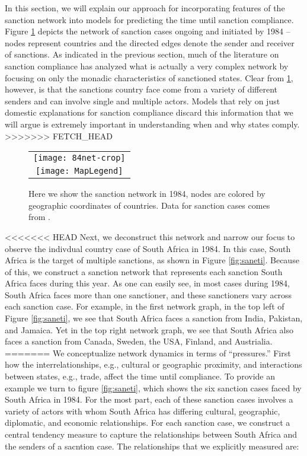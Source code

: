 In this section, we will explain our approach for incorporating features of the sanction network into models for predicting the time until sanction compliance. Figure \ref{fig:spaghetti} depicts the network of sanction cases ongoing and initiated by 1984 -- nodes represent countries and the directed edges denote the sender and receiver of sanctions. As indicated in the previous section, much of the literature on sanction compliance has analyzed what is actually a very complex network by focusing on only the monadic characteristics of sanctioned states. Clear from \ref{fig:spaghetti}, however, is that the sanctions country face come from a variety of different senders and can involve single and multiple actors. Models that rely on just domestic explanations for sanction compliance discard this information that we will argue is extremely important in understanding when and why states comply.
>>>>>>> FETCH_HEAD

\begin{figure}[ht]
  \centering
  \begin{tabular}{c}
	  \texttt{[image: 84net-crop]} \\
	  \texttt{[image: MapLegend]}
  \end{tabular}
  \caption{Here we show the sanction network in 1984, nodes are colored by geographic coordinates of countries. Data for sanction cases comes from \citet{morgan2009threat}.}
  \label{fig:spaghetti}
\end{figure}
\FloatBarrier

<<<<<<< HEAD
Next, we deconstruct this network and narrow our focus to observe the indivdual country case of South Africa in 1984. In this case, South Africa is the target of multiple sanctions, as shown in Figure \ref{fig:saneti}. Because of this, we construct a sanction network that represents each sanction South Africa faces during this year. As one can easily see, in most cases during 1984, South Africa faces more than one sanctioner, and these sanctioners vary across each sanction case. For example, in the first network graph, in the top left of Figure \ref{fig:saneti}, we see that South Africa faces a sanction from India, Pakistan, and Jamaica. Yet in the top right network graph, we see that South Africa also faces a sanction from Canada, Sweden, the USA, Finland, and Austrialia. 
=======
We conceptualize network dynamics in terms of ``pressures.'' First how the interrelationships, e.g., cultural or geographic proximity, and interactions between states, e.g., trade, affect the time until compliance. To provide an example we turn to figure \ref{fig:saneti}, which shows the six sanction cases faced by South Africa in 1984. For the most part, each of these sanction cases involves a variety of actors with whom South Africa has differing cultural, geographic, diplomatic, and economic relationships. For each sanction case, we construct a central tendency measure to capture the relationships between South Africa and the senders of a sacntion case. The relationships that we explicitly measured are:

